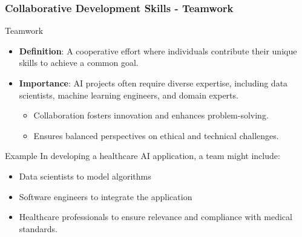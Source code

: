 \documentclass[aspectratio=169]{beamer}
\begin{document}
\begin{frame}[fragile]
    \frametitle{Collaborative Development Skills - Teamwork}
    \begin{block}{Teamwork}
        \begin{itemize}
            \item \textbf{Definition}: A cooperative effort where individuals contribute their unique skills to achieve a common goal.
            \item \textbf{Importance}: AI projects often require diverse expertise, including data scientists, machine learning engineers, and domain experts. 
            \begin{itemize}
                \item Collaboration fosters innovation and enhances problem-solving.
                \item Ensures balanced perspectives on ethical and technical challenges.
            \end{itemize}
        \end{itemize}
    \end{block}

    \begin{exampleblock}{Example}
        In developing a healthcare AI application, a team might include:
        \begin{itemize}
            \item Data scientists to model algorithms
            \item Software engineers to integrate the application
            \item Healthcare professionals to ensure relevance and compliance with medical standards.
        \end{itemize}
    \end{exampleblock}
\end{frame}
\end{document}

